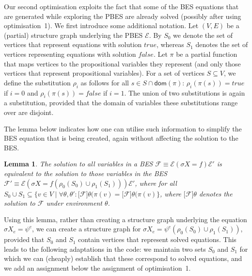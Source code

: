 \documentclass{article}
\newtheorem{lemma}[theorem]{Lemma}
\begin{document}
Our second optimisation exploits the fact that some of the BES
equations that are generated while exploring the PBES are already
solved (possibly after using optimisation~1).  We first introduce
some additional notation. Let $(V,E)$ be a (partial) structure graph
underlying the PBES $\mathcal{E}$.  By $S_0$ we denote the set of
vertices that represent equations with solution $true$, whereas
$S_1$ denotes the set of vertices representing equations with
solution $false$.  Let $\pi$ be a partial
function that maps vertices to the propositional variables they
represent (and only those vertices that represent propositional variables). 
For a set of vertices $S \subseteq V$, we define
the substitution $\rho_i$ as follows for all $s \in S \cap \textsf{dom}(\pi)$: 
$\rho_i(\pi(s)) = true$ if $i = 0$ and $\rho_i(\pi(s)) = false$ if
$i = 1$. The union of two substitutions is again a substitution, provided
that the domain of variables these substitutions range over are disjoint.

The lemma below indicates how one can utilise such information to simplify the BES equation 
that is being created, again without affecting the solution to the BES.

\begin{lemma}
The solution to all variables in a BES $\mathcal{F} \equiv \mathcal{E} (\sigma X = f) \mathcal{E}'$ is 
equivalent to the solution to those variables in the BES
$\mathcal{F}' \equiv \mathcal{E} (\sigma X = f(\rho_0(S_0) \cup \rho_1(S_1))) \mathcal{E}'$, where
for all $S_0 \cup S_1 \subseteq \{v \in V \mid \forall \theta,\theta':
\lbrack \mathcal{F} \rbrack \theta(\pi(v) = 
\lbrack \mathcal{F} \rbrack \theta(\pi(v)\}$, where $\lbrack \mathcal{F} \rbrack \theta$
denotes the solution to $\mathcal{F}$ under environment $\theta$.
\end{lemma}
Using this lemma, rather than creating a structure graph underlying the
equation $\sigma X_e = \psi^e$, we can create a structure graph
for $\sigma X_e = \psi^e(\rho_0(S_0) \cup \rho_1(S_1))$, provided that
$S_0$ and $S_1$ contain vertices that represent solved equations. 
This leads to the following adaptations in the code: we maintain
two sets $S_0$ and $S_1$ for which we can (cheaply) establish that these
correspond to solved equations, and we add an assignment below the assignment
of optimisation~1.
\end{document}
